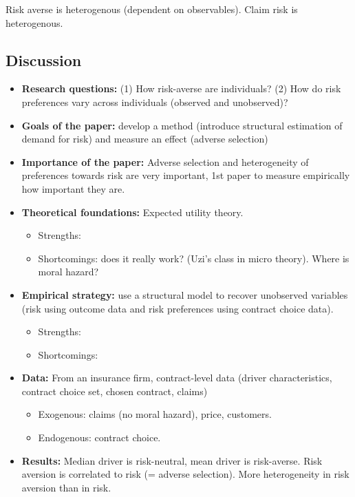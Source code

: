Risk averse is heterogenous (dependent on observables). Claim risk is heterogenous.

\subsection{Discussion}

\begin{itemize}
\item \textbf{Research questions:} (1) How risk-averse are individuals? (2) How do risk preferences vary across individuals (observed and unobserved)?
\item \textbf{Goals of the paper:} develop a method (introduce structural estimation of demand for risk) and measure an effect (adverse selection)
\item \textbf{Importance of the paper:} Adverse selection and heterogeneity of preferences towards risk are very important, 1st paper to measure empirically how important they are.
\item \textbf{Theoretical foundations:} Expected utility theory. \begin{itemize}
\item Strengths: 
\item Shortcomings: does it really work? (Uzi's class in micro theory). Where is moral hazard?
\end{itemize}
\item \textbf{Empirical strategy:} use a structural model to recover unobserved variables (risk using outcome data and risk preferences using contract choice data). \begin{itemize}
\item Strengths: 
\item Shortcomings:
\end{itemize}
\item \textbf{Data:} From an insurance firm, contract-level data (driver characteristics, contract choice set, chosen contract, claims)
\begin{itemize}
\item Exogenous: claims (no moral hazard), price, customers.
\item Endogenous: contract choice.
\end{itemize}
\item \textbf{Results:} Median driver is risk-neutral, mean driver is risk-averse. Risk aversion is correlated to risk (= adverse selection). More heterogeneity in risk aversion than in risk. 
\end{itemize}


